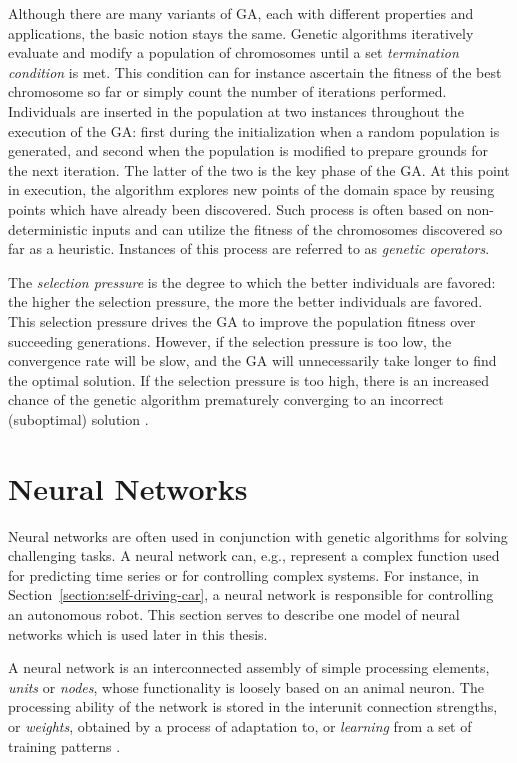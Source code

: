 Although there are many variants of GA, each with different properties and applications, the basic notion stays the same. Genetic algorithms iteratively evaluate and modify a population of chromosomes until a set \textit{termination condition} is met. This condition can for instance ascertain the fitness of the best chromosome so far or simply count the number of iterations performed. Individuals are inserted in the population at two instances throughout the execution of the GA: first during the initialization when a random population is generated, and second when the population is modified to prepare grounds for the next iteration. The latter of the two is the key phase of the GA. At this point in execution, the algorithm explores new points of the domain space by reusing points which have already been discovered. Such process is often based on non-deterministic inputs and can utilize the fitness of the chromosomes discovered so far as a heuristic. Instances of this process are referred to as \textit{genetic operators}.

The \textit{selection pressure} is the degree to which the better individuals are favored: the higher the selection pressure, the more the better individuals are favored. This selection pressure drives the GA to improve the population fitness over succeeding generations. However, if the selection pressure is too low, the convergence rate will be slow, and the GA will unnecessarily take longer to find the optimal solution. If the selection pressure is too high, there is an increased chance of the genetic algorithm prematurely converging to an incorrect (suboptimal) solution \cite{GaTournamentSelection}.

\section{Neural Networks}\label{section:neural-networks}
Neural networks are often used in conjunction with genetic algorithms for solving challenging tasks. A neural network can, e.g., represent a complex function used for predicting time series or for controlling complex systems. For instance, in Section~\ref{section:self-driving-car}, a neural network is responsible for controlling an autonomous robot. This section serves to describe one model of neural networks which is used later in this thesis.

A neural network is an interconnected assembly of simple processing elements, \textit{units} or \textit{nodes}, whose functionality is loosely based on an animal neuron. The processing ability of the network is stored in the interunit connection strengths, or \textit{weights}, obtained by a process of adaptation to, or \textit{learning} from a set of training patterns \cite{NeuralNets}.

